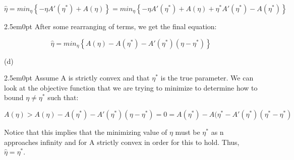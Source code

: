 \documentclass[11pt]{article}
\newenvironment{problem}[2][Problem]{\begin{trivlist}
\item[\hskip \labelsep {\bfseries #1}\hskip \labelsep {\bfseries #2.}]}{\end{trivlist}}
\begin{document}
\begin{problem}{2.3}
\[\hat{\eta} = min_{\eta}\left\{{-\eta A'(\eta^{*})+A(\eta)}\right\} = min_{\eta}\left\{{-\eta A'(\eta^{*})+A(\eta) + \eta^{*}A'(\eta^{*}) - A(\eta^{*})}\right\}\]

\begin{adjustwidth}{2.5em}{0pt}
After some rearranging of terms, we get the final equation:
\end{adjustwidth}

\[\hat{\eta}= min_{\eta}\left\{ A(\eta) - A(\eta^{*}) - A'(\eta^{*})(\eta - \eta^{*})\right\} \]

(d) 
\begin{adjustwidth}{2.5em}{0pt}
Assume A is strictly convex and that $\eta^{*}$ is the true parameter. We can look at the objective function that we are trying to minimize to determine how to bound $\eta \neq \eta^{*}$ such that:

\[A(\eta) > A(\eta)-A(\eta^{*})-A'(\eta^{*})(\eta-\eta^{*}) = 0 = A(\eta^{*})-A(\eta^{*}-A'(\eta^{*})(\eta^{*}-\eta^{*})\]

Notice that this implies that the minimizing value of $\eta$ must be $\eta^{*}$ as n approaches infinity and for A strictly convex in order for this to hold. Thus, $\hat{\eta} = \eta^{*}.$
\end{adjustwidth}

\end{problem}
\end{document}
